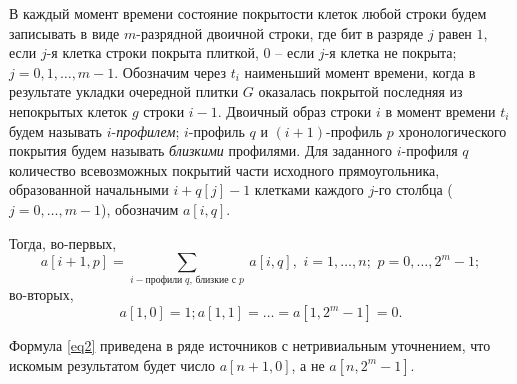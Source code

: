 В каждый момент времени состояние покрытости клеток любой строки будем записывать в виде $m$-разрядной двоичной строки, где бит в разряде $j$ равен $1$, если $j$-я клетка строки покрыта плиткой, $0$ -- если $j$-я клетка не покрыта; $j=0,1,\dots,m-1.$  
Обозначим через $t_i$ наименьший момент времени, когда в результате укладки очередной плитки $G$ оказалась покрытой последняя из непокрытых клеток $g$ строки $i-1$.
Двоичный образ строки $i$ в момент времени $t_i$ будем называть $i$-\textit{профилем};
 $i$-профиль $q$ и $(i+1)$-профиль $p$ хронологического покрытия будем называть {\it близкими} профилями.
Для заданного $i$-профиля $q$ количество всевозможных покрытий части исходного прямоугольника, образованной начальными $i+q[j]-1$ клетками каждого $j$-го столбца ($j=0,\dots, m-1$), обозначим $a[i,q]$.

Тогда, во-первых, 
\begin{equation}\label{eq2}
a[i+1,p]=\sum_{i-\text{профили}\; q,\, \text{близкие с}\; p}\ a[i,q] ,\,\,                        
i=1,\dots,n;\,\, p=0,…,2^m-1;     
\end{equation}
во-вторых,
\[a[1,0]=1; a[1,1]=\dots=a[1,2^m-1]=0.\]

Формула \eqref{eq2} приведена в ряде источников
 с нетривиальным уточнением, что искомым результатом будет число $a[n+1,0]$, 
а не $a[n,2^m-1]$.

